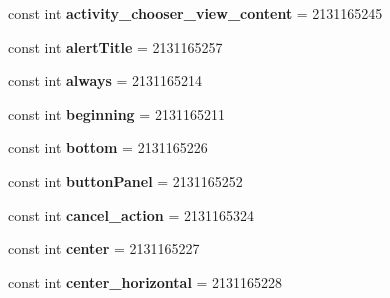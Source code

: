 \begin{DoxyCompactItemize}
const int {\bfseries activity\+\_\+chooser\+\_\+view\+\_\+content} = 2131165245
\item 
\mbox{\label{class_sample_app_1_1_droid_1_1_resource_1_1_id_ab967708e1d0d8d670cbed5373c387c0d}} 
const int {\bfseries alert\+Title} = 2131165257
\item 
\mbox{\label{class_sample_app_1_1_droid_1_1_resource_1_1_id_aae02edd70dc05f443bff7a0b33245b72}} 
const int {\bfseries always} = 2131165214
\item 
\mbox{\label{class_sample_app_1_1_droid_1_1_resource_1_1_id_af3a6c475ee96cc59d2f9323b82c5b96e}} 
const int {\bfseries beginning} = 2131165211
\item 
\mbox{\label{class_sample_app_1_1_droid_1_1_resource_1_1_id_a0da17f4336458fbceda4e83c067275df}} 
const int {\bfseries bottom} = 2131165226
\item 
\mbox{\label{class_sample_app_1_1_droid_1_1_resource_1_1_id_a668155bcd8e34e81ecc16d87ed041f55}} 
const int {\bfseries button\+Panel} = 2131165252
\item 
\mbox{\label{class_sample_app_1_1_droid_1_1_resource_1_1_id_adf96a81f22c48f04d515c1604ecb62b6}} 
const int {\bfseries cancel\+\_\+action} = 2131165324
\item 
\mbox{\label{class_sample_app_1_1_droid_1_1_resource_1_1_id_a11ee3ec9e082b321f59fd7f7fbdd5282}} 
const int {\bfseries center} = 2131165227
\item 
\mbox{\label{class_sample_app_1_1_droid_1_1_resource_1_1_id_a4816b3ced4b38de78e1a11db9dcce8a8}} 
const int {\bfseries center\+\_\+horizontal} = 2131165228
\item 
\mbox{\label{class_sample_app_1_1_droid_1_1_resource_1_1_id_abc09d27a361e25317de32d1b8c12ce96}} 

\end{DoxyCompactItemize}
